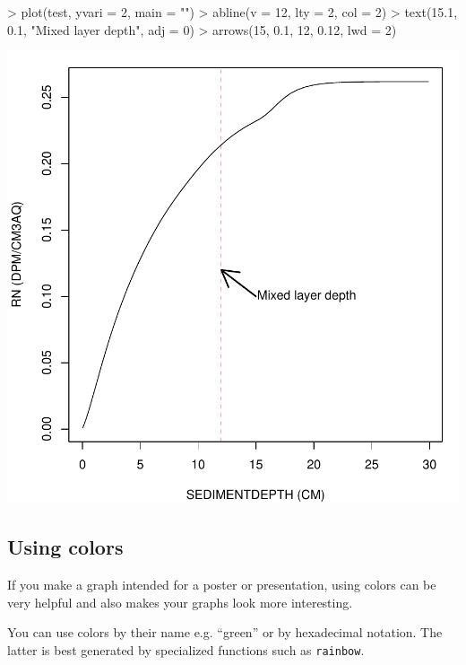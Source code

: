 \documentclass{scrartcl}
\begin{document}
\begin{Schunk}
\begin{Sinput}
> plot(test, yvari = 2, main = "")
> abline(v = 12, lty = 2, col = 2)
> text(15.1, 0.1, "Mixed layer depth", adj = 0)
> arrows(15, 0.1, 12, 0.12, lwd = 2)
\end{Sinput}
\end{Schunk}
\includegraphics{figures/f-margins}
\subsection{Using colors}
If you make a graph intended for a poster or presentation, using
colors can be very helpful and also makes your graphs look more
interesting.

You can use colors by their name e.g. ``green'' or by hexadecimal
notation. The latter is best generated by specialized functions such
as \texttt{rainbow}.
\end{document}
